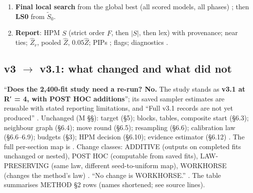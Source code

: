 \begin{tcolorbox}[sopbase,colback=white,colframe=black!60,title={SMC-BVS v3.1$(X,y,s)$ --- pipeline}]
\begin{enumerate}[leftmargin=*,label=\arabic*.]
  one random-order round at $\varphi_t$; then $L$ burn-in and 4 measured rounds at $\varphi=1$ with RB recording of $o_j$
  {}.
\item \textbf{Final local search} from the global best (all scored models, all phases) {}; then {\sffamily [v3.1] \textbf{LS0}} from $\tilde S_0$.
\item \textbf{Report}: HPM $\hat S$ (strict order $F$, then $|S|$, then lex) with provenance; near ties; $\hat Z_r$, pooled $\hat Z$,
  $0.05\hat Z$; PIPs {}; flags; diagnostics {}.
\end{enumerate}
\end{tcolorbox}

\subsection{v3 \texorpdfstring{$\to$}{->} v3.1: what changed and what did not}\label{sec:method-diff}

``\textbf{Does the 2,400-fit study need a re-run? No.} The study stands as \textbf{v3.1 at R′ = 4, with POST HOC additions}''; its
saved sampler estimates are reusable with stated reporting limitations, and ``Full v3.1 records are not yet produced''
. Unchanged (M \S\S): target (\S5); blocks, tables, composite start
(\S6.3); neighbour graph (\S6.4); move round (\S6.5); resampling (\S6.6); calibration law (\S6.6--6.9); budgets (\S3); HPM
decision (\S6.10); evidence estimator (\S6.12) . The full
per-section map is . Change classes: ADDITIVE (outputs on completed
fits unchanged or nested), POST HOC (computable from saved fits), LAW-PRESERVING (same law, different seed-to-uniform map),
WORKHORSE (changes the method's law) . ``No change is WORKHORSE.''
. The table summarises METHOD \S2 rows (names shortened; see source lines).

